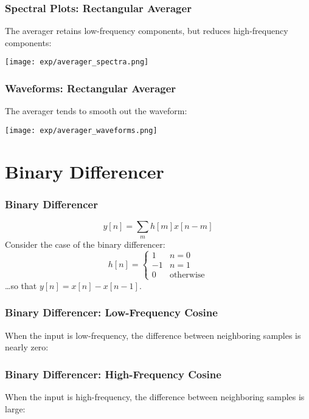\documentclass{beamer}
\begin{document}
\begin{frame}
  \frametitle{Spectral Plots: Rectangular Averager}

  The averager retains low-frequency components, but reduces
  high-frequency components:
  \centerline{\texttt{[image: exp/averager\_spectra.png]}}
\end{frame}

\begin{frame}
  \frametitle{Waveforms: Rectangular Averager}

  The averager tends to smooth out the waveform:
  \centerline{\texttt{[image: exp/averager\_waveforms.png]}}
\end{frame}


\section{Binary Differencer}
\setcounter{subsection}{1}


\begin{frame}
  \frametitle{Binary Differencer}

  \begin{displaymath}
    y[n]=\sum_m h[m]x[n-m]
  \end{displaymath}
  Consider the case of the binary differencer:
  \begin{displaymath}
    h[n]=\left\{\begin{array}{ll}
    1 & n=0\\
    -1 & n=1\\
    0 & \mbox{otherwise}
    \end{array}\right.
  \end{displaymath}
  \ldots so that $y[n]=x[n]-x[n-1]$.
\end{frame}

\begin{frame}
  \frametitle{Binary Differencer: Low-Frequency Cosine}

  When the input is low-frequency, the difference between neighboring
  samples is nearly zero:
  \centerline{}
\end{frame}

\begin{frame}
  \frametitle{Binary Differencer: High-Frequency Cosine}

  When the input is high-frequency, the difference between neighboring
  samples is large:
  \centerline{}
\end{frame}
\end{document}
